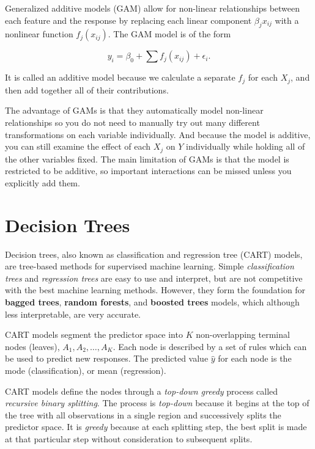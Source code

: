 \documentclass[]{book}
\begin{document}
Generalized additive models (GAM) allow for non-linear relationships between each feature and the response by replacing each linear component \(\beta_j x_{ij}\) with a nonlinear function \(f_j(x_{ij})\). The GAM model is of the form

\[y_i = \beta_0 + \sum{f_j(x_{ij})} + \epsilon_i.\]

It is called an additive model because we calculate a separate \(f_j\) for each \(X_j\), and then add together all of their contributions.

The advantage of GAMs is that they automatically model non-linear relationships so you do not need to manually try out many diﬀerent transformations on each variable individually. And because the model is additive, you can still examine the eﬀect of each \(X_j\) on \(Y\) individually while holding all of the other variables ﬁxed. The main limitation of GAMs is that the model is restricted to be additive, so important interactions can be missed unless you explicitly add them.

\hypertarget{decision-trees}{%
\chapter{Decision Trees}\label{decision-trees}}

Decision trees, also known as classification and regression tree (CART) models, are tree-based methods for supervised machine learning. Simple \emph{classification trees} and \emph{regression trees} are easy to use and interpret, but are not competitive with the best machine learning methods. However, they form the foundation for \textbf{bagged trees}, \textbf{random forests}, and \textbf{boosted trees} models, which although less interpretable, are very accurate.

CART models segment the predictor space into \(K\) non-overlapping terminal nodes (leaves), \(A_1, A_2, \dots, A_K\). Each node is described by a set of rules which can be used to predict new responses. The predicted value \(\hat{y}\) for each node is the mode (classification), or mean (regression).

CART models define the nodes through a \emph{top-down greedy} process called \emph{recursive binary splitting}. The process is \emph{top-down} because it begins at the top of the tree with all observations in a single region and successively splits the predictor space. It is \emph{greedy} because at each splitting step, the best split is made at that particular step without consideration to subsequent splits.
\end{document}
